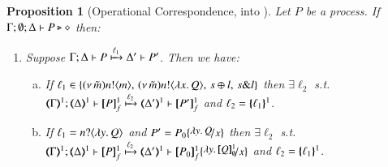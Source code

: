 \documentclass[preprint,11pt]{elsarticle}
\newtheorem{proposition}{Proposition}[section]
\begin{document}
{{%
%
%		    


\begin{proposition}[Operational Correspondence, \HOp into \HO]\rm
	\label{prop:op_corr_HOp_to_HO}
	Let $P$ be a \HOp process.
	If $\Gamma; \emptyset; \Delta \vdash P \triangleright \diamond$ then:
%
	\begin{enumerate}[1.]
		\item
			Suppose $\Gamma; \Delta \vdash P \xmapsto{\ell_1} \Delta' \vdash P'$. Then we have:
%
			\begin{enumerate}[a)]
				\item
					If $\ell_1 \in \{(\nu\, \tilde{m})n ! \langle m \rangle, \,(\nu\, \tilde{m})n ! \langle \lambda x.\,Q \rangle, \,s \oplus l, \,s \& l\}$
					then $\exists \ell_2$ s.t. \\
					$\horel{\tmap{\Gamma}{1}}{\tmap{\Delta}{1}}{\pmapp{P}{1}{f}}{\hby{\ell_2}}{\tmap{\Delta'}{1}}{\pmapp{P'}{1}{f}}$
					and $\ell_2 = \{\!\!\{\ell_1\}\!\!\}^{1}$.
			
				\item
					If $\ell_1 = n ? \langle \lambda y.\,Q \rangle$ and
					$P' = P_0 \subst{\abs{y}Q}{x}$
					then $\exists \ell_2$ s.t. \\
					$\horel{\tmap{\Gamma}{1}}{\tmap{\Delta}{1}}{\pmapp{P}{1}{f}}{\hby{\ell_2}}{\tmap{\Delta'}{1}}{\pmapp{P_0}{1}{f}\subst{\abs{y}\pmapp{Q}{1}{\emptyset}}{x}}$
					and $\ell_2 = \{\!\!\{\ell_1\}\!\!\}^{1}$.
			

\end{enumerate}
\end{enumerate}
\end{proposition}}}
\end{document}
